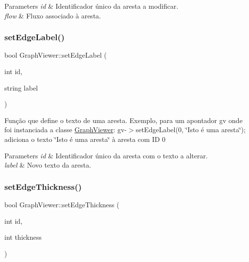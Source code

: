 \begin{DoxyParams}{Parameters}
{\em id} & Identificador único da aresta a modificar. \\
\hline
{\em flow} & Fluxo associado à aresta. \\
\hline
\end{DoxyParams}
\mbox{\label{class_graph_viewer_a447cca0064e785654c2105602c2961ca}} 
\subsubsection{\texorpdfstring{set\+Edge\+Label()}{setEdgeLabel()}}
{\footnotesize\ttfamily bool Graph\+Viewer\+::set\+Edge\+Label (\begin{DoxyParamCaption}\item[{int}]{id,  }\item[{string}]{label }\end{DoxyParamCaption})}

Função que define o texto de uma aresta. Exemplo, para um apontador gv onde foi instanciada a classe \mbox{\hyperlink{class_graph_viewer}{Graph\+Viewer}}\+: gv-\/$>$set\+Edge\+Label(0, \char`\"{}\+Isto é uma aresta\char`\"{}); adiciona o texto \char`\"{}\+Isto é uma aresta\char`\"{} à aresta com ID 0


\begin{DoxyParams}{Parameters}
{\em id} & Identificador único da aresta com o texto a alterar. \\
\hline
{\em label} & Novo texto da aresta. \\
\hline
\end{DoxyParams}
\mbox{\label{class_graph_viewer_a07f598272fe3515455eab13be749604a}} 
\subsubsection{\texorpdfstring{set\+Edge\+Thickness()}{setEdgeThickness()}}
{\footnotesize\ttfamily bool Graph\+Viewer\+::set\+Edge\+Thickness (\begin{DoxyParamCaption}\item[{int}]{id,  }\item[{int}]{thickness }\end{DoxyParamCaption})}

